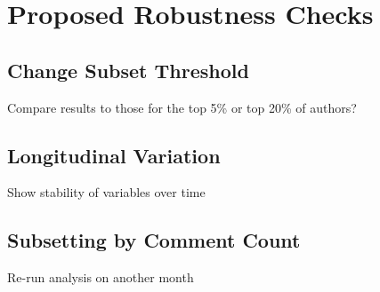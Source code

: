 \section{Proposed Robustness Checks} \label{robustness}

\subsection{Change Subset Threshold}

Compare results to those for the top 5\% or top 20\% of authors?

\subsection{Longitudinal Variation}

Show stability of variables over time

\subsection{Subsetting by Comment Count}

Re-run analysis on another month